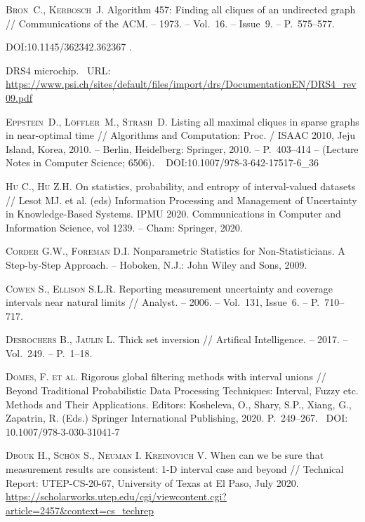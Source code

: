 \documentclass[a5paper,openany]{book}
\newcommand{\electronicbook}{}%
\newcommand{\doi}[1]{
    \ifdefined\electronicbook
        DOI:#1
    \fi}%
\begin{document}
\begin{thebibliography}{999}
\textsc{Bron~C., Kerbosch~J.} Algorithm 457: Finding all cliques of an undirected 
graph // Communications of the ACM. -- 1973. -- Vol.~16. -- Issue~9. -- P.~575--577.
\doi{10.1145/362342.362367}.
  
DRS4 microchip. \  URL: 
\url{https://www.psi.ch/sites/default/files/import/drs/DocumentationEN/DRS4_rev09.pdf}
     
\textsc{Eppstein~D., Löffler~M., Strash~D.} Listing all maximal cliques in sparse 
graphs in near-optimal time // Algorithms and Computation: Proc. / ISAAC 2010, Jeju Island, 
Korea, 2010. -- Berlin, Heidelberg: Springer, 2010. -- P.~403--414 -- (Lecture Notes in 
Computer Science; 6506). \  \doi{10.1007/978-3-642-17517-6\_36}
  
\textsc{Hu C., Hu Z.H.} On statistics, probability, and entropy of interval-valued 
datasets // Lesot MJ. et al. (eds) Information Processing and Management of Uncertainty 
in Knowledge-Based Systems. IPMU 2020. Communications in Computer and Information 
Science, vol 1239. -- Cham: Springer, 2020. 
  
\textsc{Corder G.W., Foreman D.I.} Nonparametric Statistics for Non-Statisticians. 
A Step-by-Step Approach. -- Hoboken, N.J.: John Wiley and Sons, 2009. 
  
\textsc{Cowen S., Ellison S.L.R.}  
Reporting measurement uncertainty and coverage intervals near natural limits // 
Analyst. -- 2006. -- Vol.~131, Issue~6. -- P.~710--717. 
  
\textsc{Desrochers B., Jaulin L.} Thick set inversion // Artifical Intelligence. 
-- 2017. -- Vol.~249. -- P.~1--18. 
  
\textsc{Domes, F. et al.} Rigorous global filtering methods with interval unions // 
Beyond Traditional Probabilistic Data Processing Techniques: Interval, Fuzzy etc. 
Methods and Their Applications. Editors: Kosheleva, O., Shary, S.P., Xiang, G., 
Zapatrin, R. (Eds.) Springer International Publishing, 2020. P.~249--267. \ 
DOI: 10.1007/978-3-030-31041-7
 
\textsc{Dbouk H., Sch{\"o}n S., Neuman I. Kreinovich V.}
When can we be sure that measurement results are consistent: 1-D interval case and beyond 
// Technical Report: UTEP-CS-20-67, University of Texas at El Paso, July 2020. 
\url{https://scholarworks.utep.edu/cgi/viewcontent.cgi?article=2457&context=cs_techrep} 


\end{thebibliography}
\end{document}
